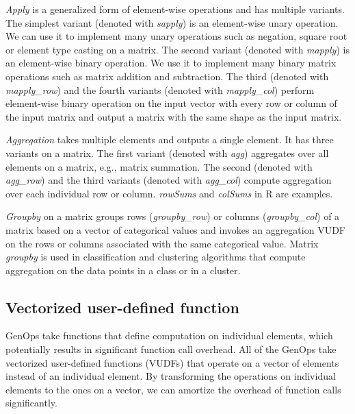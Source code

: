 \textit{Apply} is a generalized form of element-wise operations and has
multiple variants. The simplest variant (denoted with \textit{sapply}) is
an element-wise unary operation. We can use it to implement many unary
operations such as negation, square root or element type casting
on a matrix. The second variant (denoted with \textit{mapply}) is an
element-wise binary operation. We use it to implement many binary
matrix operations such as matrix addition and subtraction. The third
(denoted with \textit{mapply\_row}) and the fourth variants (denoted with
\textit{mapply\_col}) perform element-wise
binary operation on the input vector with every row or column of the input
matrix and output a matrix with the same shape as the input matrix.

\textit{Aggregation} takes multiple elements and outputs a single element.
It has three variants on a matrix. The first variant (denoted with \textit{agg})
aggregates over all elements on a matrix, e.g., matrix summation. The second
(denoted with
\textit{agg\_row}) and the third variants (denoted with \textit{agg\_col})
compute aggregation over each individual row or column. \textit{rowSums}
and \textit{colSums} in R are examples.

\textit{Groupby} on a matrix groups rows (\textit{groupby\_row}) or columns
(\textit{groupby\_col}) of a matrix based on a vector of categorical values
and invokes an aggregation VUDF on the rows or
columns associated with the same categorical value. Matrix \textit{groupby}
is used in classification and clustering algorithms that compute
aggregation on the data points in a class or in a cluster.

\subsection{Vectorized user-defined function} \label{sec:vudf}
GenOps take functions that define computation on individual elements,
which potentially results in significant function call overhead. All of
the GenOps take vectorized user-defined functions (VUDFs) that operate on
a vector of elements instead of an individual element. By transforming
the operations on individual elements to the ones on a vector, we can
amortize the overhead of function calls significantly.

